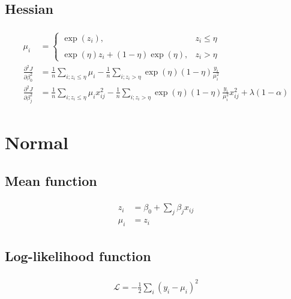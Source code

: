 \documentclass[a4paper]{article}
\begin{document}
\subsection{Hessian}
\def \poissonexphess{
\begin{align}
\begin{split}
\mu_i &= 
\begin{cases}
\exp(z_i),  & z_i \leq \eta \\
\\
\exp(\eta)z_i + (1-\eta)\exp(\eta),  & z_i > \eta
\end{cases}
\\
\frac{\partial^2 J}{\partial \beta_0^2} &= \frac{1}{n}\sum_{i; z_i \leq \eta} \mu_i
- \frac{1}{n}\sum_{i; z_i > \eta} \exp(\eta) (1 - \eta) \frac{y_i}{\mu_i^2}  \\
\frac{\partial^2 J}{\partial \beta_j^2} &=  \frac{1}{n}\sum_{i; z_i \leq \eta} \mu_i x_{ij}^2
- \frac{1}{n}\sum_{i; z_i > \eta} \exp(\eta) (1 - \eta) \frac{y_i}{\mu_i^2} x_{ij}^2
+ \lambda (1 - \alpha)
\end{split}
\end{align}}
\poissonexphess

\section{Normal}

\subsection{Mean function}
\def \normalmean{
\begin{align}
\begin{split}
z_i &= \beta_0 + \sum_j \beta_j x_{ij} \\
\mu_i &= z_i
\end{split}
\end{align}
}
\normalmean

\subsection{Log-likelihood function}
\def \normallogL{
\begin{align}
\begin{split}
\mathcal{L} = -\frac{1}{2} \sum_i (y_i - \mu_i)^2 \\
\end{split}
\end{align}
}
\normallogL
\end{document}
